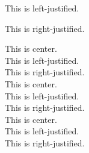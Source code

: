 \documentclass[12pt]{article}
\begin{document}
\vspace{1cm}
\begin{flushleft}
This is left-justified.
\end{flushleft}

\vspace{1cm}
\begin{flushright}
This is right-justified.
\end{flushright}

\vspace{1cm}
\centering
This is center.\\ 
This is left-justified.\\
This is right-justified.\\

\vspace{1cm}
\large
This is center.\\ 
This is left-justified.\\
This is right-justified.\\

\vspace{1cm}
\large
This is center.\\ 
This is left-justified.\\
This is right-justified.\\
\end{document}
